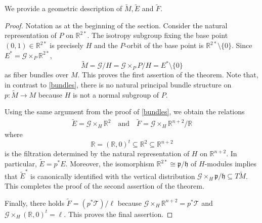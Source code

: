 \documentclass[11pt]{amsart}
\newtheorem{theorem}[proposition]{Theorem}
\begin{document}
We provide a geometric description of $\tilde M,\tilde E$ and $\tilde F$.
\begin{proof}
Notation as at the beginning of the section. Consider the natural representation of $P$ on $\mathbb R^{2*}$. The isotropy subgroup fixing the base point $(0,1)\in\mathbb R^{2*}$ is precisely $H$ and the $P$-orbit of the base point is $\mathbb R^{2*}\setminus\{0\}$. Since $E^*=\mathcal G\times_P\mathbb R^{2*}$,
\[\tilde M=\mathcal G/H=\mathcal G\times_PP/H=E^*\setminus\{0\}\]
as fiber bundles over $M$. This proves the first assertion of the theorem. Note that, in contrast to \cref{bundles}, there is no natural principal bundle structure on $p:\tilde M\to M$ because $H$ is not a normal subgroup of $P$.

Using the same argument from the proof of \cref{bundles}, we obtain the relations
\begin{align*}
\tilde E=\mathcal G\times_H\mathbb R^2
\quad\text{and}\quad
\tilde F=\mathcal G\times_H\mathbb R^{n+2}/\mathbb R
\end{align*}
where 
\[\mathbb R=(\mathbb R,0)^t\subseteq\mathbb R^2\subseteq\mathbb R^{n+2}\]
is the filtration determined by the natural representation of $H$ on $\mathbb R^{n+2}$. In particular, $\tilde E=p^*E$. Moreover, the isomorphism $\mathbb R^{2*}\cong\mathfrak p/\mathfrak h$ of $H$-modules implies that $\tilde E^*$ is canonically identified with the vertical distribution $\mathcal G\times_H\mathfrak p/\mathfrak h\subseteq T\tilde M$. This completes the proof of the second assertion of the theorem.

Finally, there holds $\tilde F=(p^*\mathcal T)/\ell$ because $\mathcal G\times_H\mathbb R^{n+2}=p^*\mathcal T$ and $\mathcal G\times_H(\mathbb R,0)^t=\ell$. This proves the final assertion.
\end{proof}
\end{document}
